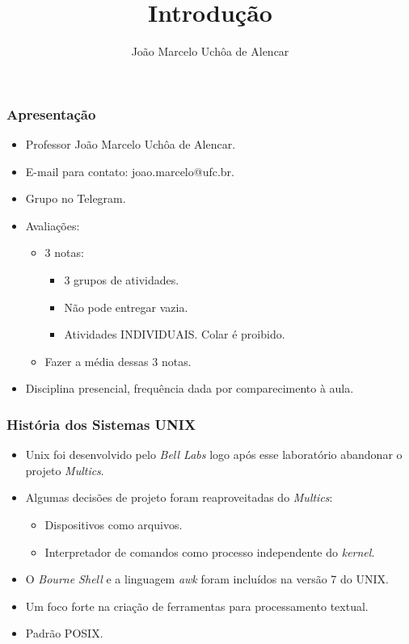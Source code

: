 \documentclass{beamer}
\title{Introdução}
\author[João Marcelo Uchôa de Alencar]{João Marcelo Uchôa de Alencar}
\institute{Universidade Federal do Ceará - Quixadá}
\begin{document}
   \begin{frame}
      \titlepage
   \end{frame}


\begin{frame}
   \frametitle{Apresentação}
   \begin{itemize}
      \item Professor João Marcelo Uchôa de Alencar.
      \item E-mail para contato: joao.marcelo@ufc.br.
      \item Grupo no Telegram.
      \item Avaliações:
      \begin{itemize}
         \item 3 notas: 
	      \begin{itemize}
            \item 3 grupos de atividades.
            \item Não pode entregar vazia.
            \item Atividades INDIVIDUAIS. Colar é proibido. 
         \end{itemize}
	      \item Fazer a média dessas 3 notas. 
      \end{itemize}
      \item Disciplina presencial, frequência dada por comparecimento à aula. 
   \end{itemize}
\end{frame}


\begin{frame}
   \frametitle{História dos Sistemas UNIX}
   \begin{itemize}
      \item Unix foi desenvolvido pelo \textit{Bell Labs} logo após esse laboratório abandonar o projeto \textit{Multics}.
      \item Algumas decisões de projeto foram reaproveitadas do \textit{Multics}:
      \begin{itemize}
         \item Dispositivos como arquivos.
	 \item Interpretador de comandos como processo independente do \textit{kernel}.
      \end{itemize}
      \item O \textit{Bourne Shell} e a linguagem \textit{awk} foram incluídos na versão 7 do UNIX.
      \item Um foco forte na criação de ferramentas para processamento textual.
      \item Padrão POSIX.
   \end{itemize}
\end{frame}
\end{document}
